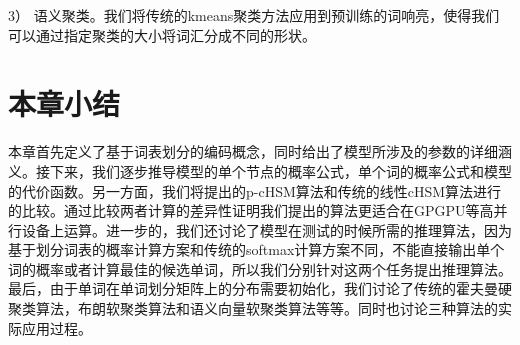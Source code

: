3） 语义聚类。我们将传统的kmeans聚类方法应用到预训练的词响亮，使得我们可以通过指定聚类的大小将词汇分成不同的形状。

\section{本章小结}
本章首先定义了基于词表划分的编码概念，同时给出了模型所涉及的参数的详细涵义。接下来，我们逐步推导模型的单个节点的概率公式，单个词的概率公式和模型的代价函数。另一方面，我们将提出的p-cHSM算法和传统的线性cHSM算法进行的比较。通过比较两者计算的差异性证明我们提出的算法更适合在GPGPU等高并行设备上运算。进一步的，我们还讨论了模型在测试的时候所需的推理算法，因为基于划分词表的概率计算方案和传统的softmax计算方案不同，不能直接输出单个词的概率或者计算最佳的候选单词，所以我们分别针对这两个任务提出推理算法。最后，由于单词在单词划分矩阵上的分布需要初始化，我们讨论了传统的霍夫曼硬聚类算法，布朗软聚类算法和语义向量软聚类算法等等。同时也讨论三种算法的实际应用过程。